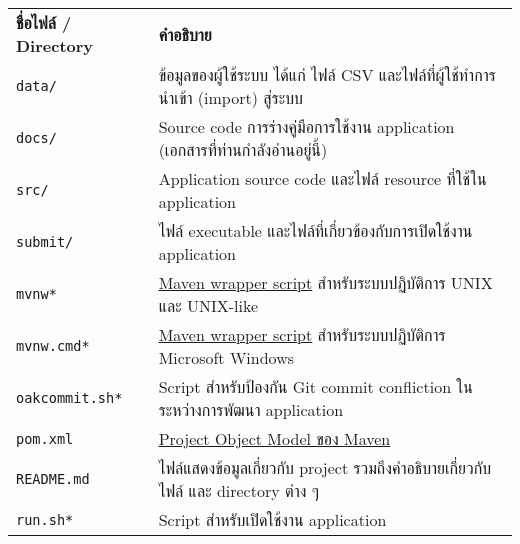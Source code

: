 \begin{tabularx}{\textwidth}{ p{8em} p{\textwidth-8em} }
\textbf{ชื่อไฟล์ / Directory}      & \textbf{คำอธิบาย} \\
\texttt{data/}              & ข้อมูลของผู้ใช้ระบบ ได้แก่ ไฟล์ CSV และไฟล์ที่ผู้ใช้ทำการนำเข้า (import) สู่ระบบ \\
\texttt{docs/}              & Source code การร่างคู่มือการใช้งาน application (เอกสารที่ท่านกำลังอ่านอยู่นี้) \\
\texttt{src/}               & Application source code และไฟล์ resource ที่ใช้ใน application \\
\texttt{submit/}            & ไฟล์ executable และไฟล์ที่เกี่ยวข้องกับการเปิดใช้งาน application \\
\texttt{mvnw*}              & \href{https://maven.apache.org/wrapper/}{Maven wrapper script} สําหรับระบบปฏิบัติการ UNIX และ UNIX-like \\
\texttt{mvnw.cmd*}          & \href{https://maven.apache.org/wrapper/}{Maven wrapper script} สําหรับระบบปฏิบัติการ Microsoft Windows \\
\texttt{oakcommit.sh*}      & Script สำหรับป้องกัน Git commit confliction ในระหว่างการพัฒนา application \\
\texttt{pom.xml}            & \href{https://maven.apache.org/guides/introduction/introduction-to-the-pom.html}{Project Object Model ของ Maven} \\
\texttt{README.md}          & ไฟล์แสดงข้อมูลเกี่ยวกับ project รวมถึงคำอธิบายเกี่ยวกับไฟล์ และ directory ต่าง ๆ \\
\texttt{run.sh*}            & Script สำหรับเปิดใช้งาน application
\end{tabularx}
